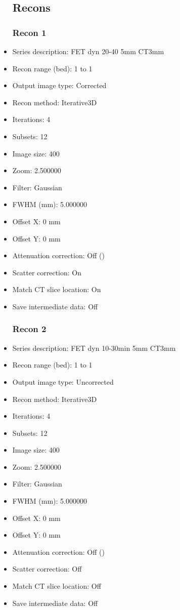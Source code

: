 \documentclass[12pt]{article}
\begin{document}
\begin{itemize}[noitemsep]
\subsection{Recons}
\subsubsection{Recon 1}
\item Series description: FET dyn 20-40 5mm CT3mm
\item Recon range (bed): 1 to 1
\item Output image type: Corrected
\item Recon method: Iterative3D
\item Iterations: 4
\item Subsets: 12
\item Image size: 400
\item Zoom: 2.500000
\item Filter: Gaussian
\item FWHM (mm): 5.000000
\item Offset X: 0 mm
\item Offset Y: 0 mm
\item Attenuation correction: Off ()
\item Scatter correction: On
\item Match CT slice location: On
\item Save intermediate data: Off
\subsubsection{Recon 2}
\item Series description: FET dyn 10-30min 5mm CT3mm
\item Recon range (bed): 1 to 1
\item Output image type: Uncorrected
\item Recon method: Iterative3D
\item Iterations: 4
\item Subsets: 12
\item Image size: 400
\item Zoom: 2.500000
\item Filter: Gaussian
\item FWHM (mm): 5.000000
\item Offset X: 0 mm
\item Offset Y: 0 mm
\item Attenuation correction: Off ()
\item Scatter correction: Off
\item Match CT slice location: Off
\item Save intermediate data: Off

\end{itemize}
\end{document}
